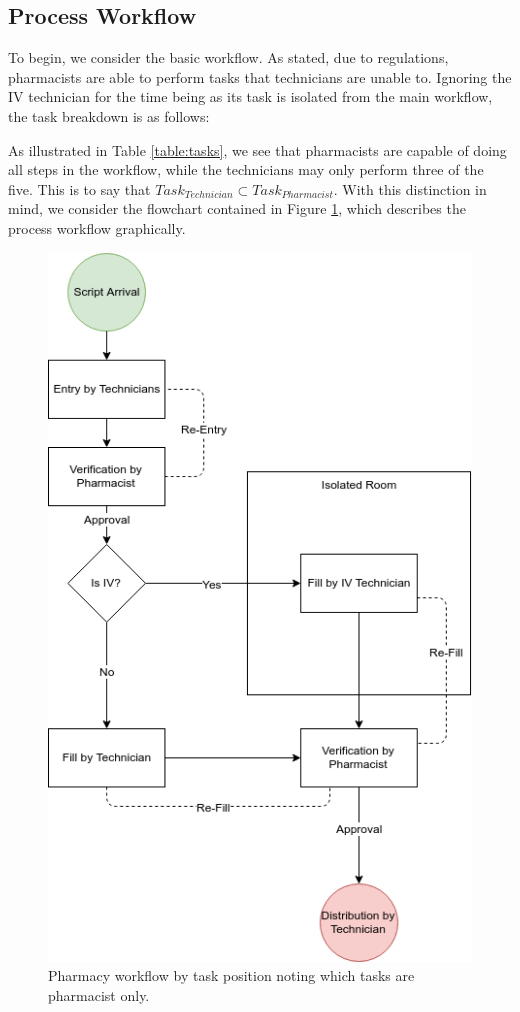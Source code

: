 \documentclass[10pt]{report}            %
\begin{document}
\subsection*{Process Workflow}
To begin, we consider the basic workflow. As stated, due to regulations, pharmacists are able to perform tasks that technicians are unable to. Ignoring the IV technician for the time being as its task is isolated from the main workflow, the task breakdown is as follows:

As illustrated in Table \ref{table:tasks}, we see that pharmacists are capable of doing all steps in the workflow, while the technicians may only perform three of the five. This is to say that $Task_{Technician}\subset Task_{Pharmacist}$.  With this distinction in mind, we consider the flowchart contained in Figure \ref{fig:flowchart}, which describes the process workflow graphically.
\begin{figure}[H]
\centering
\includegraphics[scale=.5]{Flowchart.png}
\caption{Pharmacy workflow by task position noting which tasks are pharmacist only.}
\label{fig:flowchart}
\end{figure}
\end{document}
